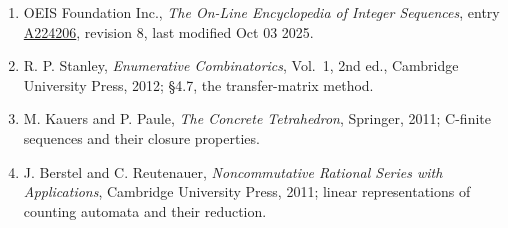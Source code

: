 \documentclass[11pt]{article}
\theoremstyle{definition}
\begin{document}
\begin{enumerate}

\item OEIS Foundation Inc., \emph{The On-Line Encyclopedia of Integer Sequences}, entry \href{https://oeis.org/A224206}{A224206}, revision 8, last modified Oct 03 2025.

\item R. P. Stanley, \emph{Enumerative Combinatorics}, Vol.~1, 2nd ed., Cambridge University Press, 2012; \S4.7, the transfer-matrix method.

\item M. Kauers and P. Paule, \emph{The Concrete Tetrahedron}, Springer, 2011; C-finite sequences and their closure properties.

\item J. Berstel and C. Reutenauer, \emph{Noncommutative Rational Series with Applications}, Cambridge University Press, 2011; linear representations of counting automata and their reduction.

\end{enumerate}
\end{document}
